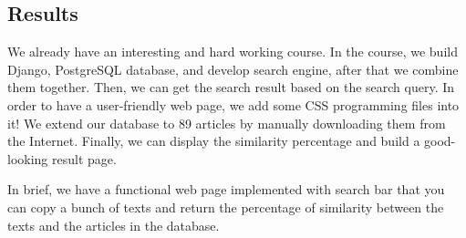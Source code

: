 
\subsection{Results}
We already have an interesting and hard working course. In the course, we build Django, PostgreSQL database, and develop search engine, after that we combine them together. Then, we can get the search result based on the search query. In order to have a user-friendly web page, we add some CSS programming files into it! We extend our database to 89 articles by manually downloading them from the Internet. Finally, we can display the similarity percentage and build a good-looking result page.

In brief, we have a functional web page implemented with search bar that you can copy a bunch of texts and return the percentage of similarity between the texts and the articles in the database.
